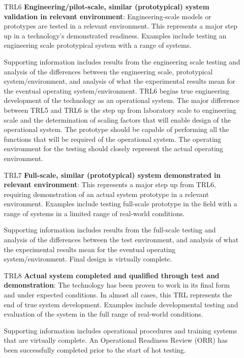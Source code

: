 \begin{enumerate}
    \item[\footnotesize TRL6] \textbf{Engineering/pilot-scale, similar (prototypical) system validation in relevant environment}: Engineering-scale models or prototypes are tested in a relevant environment. This represents a major step up in a technology's demonstrated readiness. Examples include testing an engineering scale prototypical system with a range of systems. 
    
    Supporting information includes results from the engineering scale testing and analysis of the differences between the engineering scale, prototypical system/environment, and analysis of what the experimental results mean for the eventual operating system/environment. TRL6 begins true engineering development of the technology as an operational system. The major difference between TRL5 and TRL6 is the step up from laboratory scale to engineering scale and the determination of scaling factors that will enable design of the operational system. The prototype should be capable of performing all the functions that will be required of the operational system. The operating environment for the testing should closely represent the actual operating environment.
    
    \item[\footnotesize TRL7] \textbf{Full-scale, similar (prototypical) system demonstrated in relevant environment}: This represents a major step up from TRL6, requiring demonstration of an actual system prototype in a relevant environment. Examples include testing full-scale prototype in the field with a range of systems in a limited range of real-world conditions. 
    
    Supporting information includes results from the full-scale testing and analysis of the differences between the test environment, and analysis of what the experimental results mean for the eventual operating system/environment. Final design is virtually complete.
    
    \item[\footnotesize TRL8] \textbf{Actual system completed and qualified through test and demonstration}: The technology has been proven to work in its final form and under expected conditions. In almost all cases, this TRL represents the end of true system development. Examples include developmental testing and evaluation of the system in the full range of real-world conditions. 
    
    Supporting information includes operational procedures and training systems that are virtually complete. An Operational Readiness Review (ORR) has been successfully completed prior to the start of hot testing.
    

\end{enumerate}
